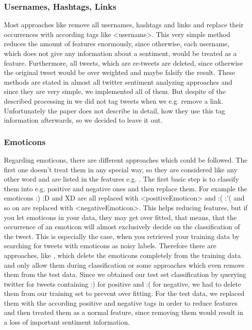 \documentclass{sig-alternate}
\begin{document}
\subsubsection{Usernames, Hashtags, Links}
Most approaches like \cite{go2009twitter} remove all usernames, hashtags and links and replace their occurrences with according tags like <username>. This very simple method reduces the amount of features enormously, since otherwise, each username, which does not give any information about a sentiment, would be treated as a feature. Furthermore, all tweets, which are re-tweets are deleted, since otherwise the original tweet would be over weighted and maybe falsify the result. These methods are stated in almost all twitter sentiment analyzing approaches and since they are very simple, we implemented all of them. But despite of the described processing in \cite{kouloumpis2011twitter} we did not tag tweets when we e.g. remove a link. Unfortunately the paper does not describe in detail, how they use this tag information afterwards, so we decided to leave it out.

\subsubsection{Emoticons}
Regarding emoticons, there are different approaches which could be followed. The first one doesn't treat them in any special way, so they are considered like any other word and are listed in the features e.g. \cite{JayantTwitter}. The first basic step is to classify them into e.g. positive and negative ones and then replace them. For example the emoticons :) :D and XD are all replaced with <positiveEmoticon> and :( :'( and so on are replaced with <negativeEmoticon>. This helps reducing features, but if you let emoticons in your data, they may get over fitted, that means, that the occurrence of an emoticon will almost exclusively decide on the classification of the tweet. This is especially the case, when you retrieved your training data by searching for tweets with emoticons as noisy labels. Therefore there are approaches, like \cite{go2009twitter}, which delete the emoticons completely from the training data and only allow them during classification or some approaches which even remove them from the test data. Since we obtained our test set classification by querying twitter for tweets containing :) for positive and :( for negative, we had to delete them from our training set to prevent over fitting. For the test data, we replaced them with the according positive and negative tags in order to reduce features and then treated them as a normal feature, since removing them would result in a loss of important sentiment information.
\end{document}
